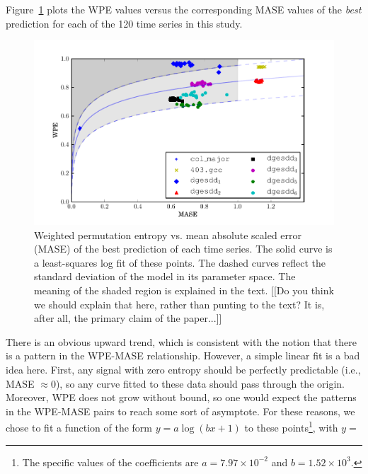 Figure~\ref{fig:wpe_vs_mase_best} plots the WPE values versus the
corresponding MASE values of the \emph{best} prediction for each of
the 120 time series in this study.
\begin{figure}
  \centering
  \includegraphics[width=1.1\columnwidth]{figs/new_prediction_vs_entropy}
  \caption{Weighted permutation entropy vs. mean absolute scaled error
    (MASE) of the best prediction of each time series.  The solid
    curve is a least-squares log fit of these points.
%
%
The dashed curves reflect the standard deviation of the model in its
parameter space.  The meaning of the shaded region is explained in the
text. \alert{[[Do you think we should explain that here, rather than
      punting to the text?  It is, after all, the primary claim of the
      paper...]]}}
  \label{fig:wpe_vs_mase_best}
\end{figure}
%
%
There is an obvious upward trend, which is consistent with the notion
that there is a pattern in the WPE-MASE relationship.  However, a
simple linear fit is a bad idea here.  First, any signal with zero
entropy should be perfectly predictable (i.e., MASE $\approx 0$), so
any curve fitted to these data should pass through the origin.
Moreover, WPE does not grow without bound, so one would expect the
patterns in the WPE-MASE pairs to reach some sort of asymptote.  For
these reasons, we chose to fit a function of the form $y = a \log(b x
+ 1)$ to these points\footnote{The specific values of the coefficients
  are $a=7.97 \times 10^{-2}$ and $b=1.52 \times 10^3$.}, with $y =$
